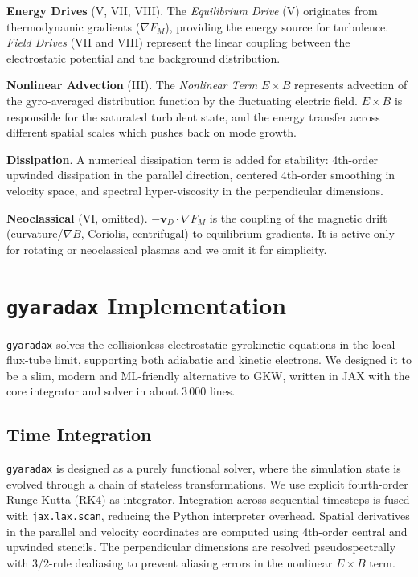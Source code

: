 \documentclass{article}
\theoremstyle{plain}
\theoremstyle{definition}
\theoremstyle{remark}
\begin{document}
\colorbox{jaxtealdark!20}{\textbf{Energy Drives} (V, VII, VIII).} The \textit{Equilibrium Drive} (V) originates from thermodynamic gradients ($\nabla F_M$), providing the energy source for turbulence. \textit{Field Drives} (VII and VIII) represent the linear coupling between the electrostatic potential and the background distribution.
%

\colorbox{jaxred!20}{\textbf{Nonlinear Advection} (III).} The \textit{Nonlinear Term} $E \times B$ represents advection of the gyro-averaged distribution function by the fluctuating electric field. $E \times B$ is responsible for the saturated turbulent state, and the energy transfer across different spatial scales which pushes back on mode growth.
%

\colorbox{jaxblue!15}{\textbf{Dissipation}.} A numerical dissipation term is added for stability: 4th-order upwinded dissipation in the parallel direction, centered 4th-order smoothing in velocity space, and spectral hyper-viscosity in the perpendicular dimensions.
%

\colorbox{gray!25}{\textbf{Neoclassical} (VI, omitted).} $-\mathbf{v}_D \cdot \nabla F_M$ is the coupling of the magnetic drift (curvature/$\nabla B$, Coriolis, centrifugal) to equilibrium gradients. It is active only for rotating or neoclassical plasmas and we omit it for simplicity.

\section{\texttt{gyaradax} Implementation}
\label{sec:gyaradax}
\texttt{gyaradax} solves the collisionless electrostatic gyrokinetic equations in the local flux-tube limit, supporting both adiabatic and kinetic electrons. We designed it to be a slim, modern and ML-friendly alternative to GKW, written in JAX with the core integrator and solver in about 3\,000 lines.

\subsection{Time Integration}
\texttt{gyaradax} is designed as a purely functional solver, where the simulation state is evolved through a chain of stateless transformations.
%
We use explicit fourth-order Runge-Kutta (RK4) as integrator.
%
Integration across sequential timesteps is fused with \texttt{jax.lax.scan}, reducing the Python interpreter overhead.
%
Spatial derivatives in the parallel and velocity coordinates are computed using 4th-order central and upwinded stencils. The perpendicular dimensions are resolved pseudospectrally with 3/2-rule dealiasing to prevent aliasing errors in the nonlinear $E \times B$ term.
\end{document}
